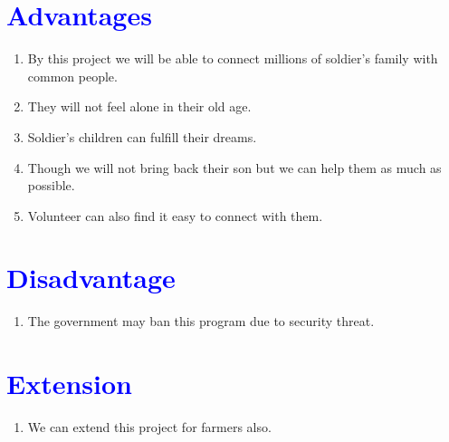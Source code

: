 \documentclass[17pt, journal]{IEEEtran}
\begin{document}
\section{\textcolor{blue}{\Large Advantages}}
\begin{enumerate}
  \item \Large By this project we will be able to connect millions of soldier's family with common people.
  \item \Large They will not feel alone in their old age.
  \item \Large Soldier's children can fulfill their dreams.
  \item \Large Though we will not bring back their son but we can help them as much as possible.
  \item \Large Volunteer can also find it easy to connect with them.
\end{enumerate}

\section{\textcolor{blue}{\Large Disadvantage}}
\begin{enumerate}
 \item \Large The government may ban this program due to security threat.
\end{enumerate}

\section{\textcolor{blue}{\Large Extension}}
\begin{enumerate}
 \item \Large We can extend this project for farmers also.
\end{enumerate}
\end{document}

